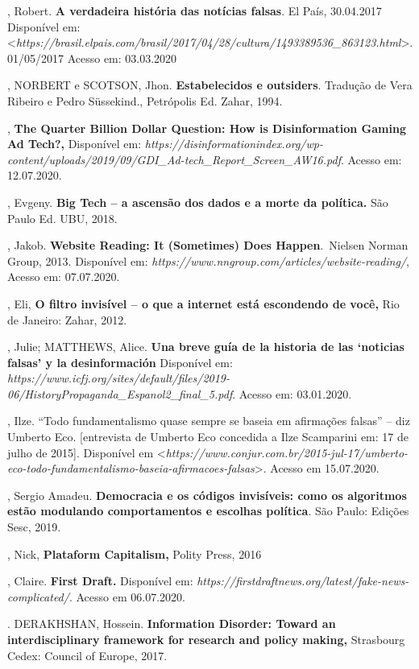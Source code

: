 \begin{bibliohedra}
, Robert. \textbf{A verdadeira história das notícias falsas}. El
País, 30.04.2017 Disponível em:
\textless{}\textit{https://brasil.elpais.com/brasil/2017/04/28/cultura/1493389536\_863123.html}\textgreater{}.
01/05/2017 Acesso em: 03.03.2020

, NORBERT e SCOTSON, Jhon. \textbf{Estabelecidos e outsiders}.
Tradução de Vera Ribeiro e Pedro Süssekind., Petrópolis Ed. Zahar, 1994.

, \textbf{The Quarter Billion Dollar
Question: How is Disinformation Gaming Ad Tech?,} Disponível em:
\textit{https://disinformationindex.org/wp-content/uploads/2019/09/GDI\_Ad-tech\_Report\_Screen\_AW16.pdf}.
Acesso em: 12.07.2020.

, Evgeny. \textbf{Big Tech -- a ascensão dos dados e a
morte da política.} São Paulo Ed. UBU, 2018.

, Jakob. \textbf{Website Reading: It (Sometimes) Does
Happen}.~Nielsen Norman Group, 2013. Disponível
em: \textit{https://www.nngroup.com/articles/website-reading/},
Acesso em: 07.07.2020.~

, Eli, \textbf{O filtro invisível -- o que a internet está
escondendo de você,} Rio de Janeiro: Zahar, 2012.

, Julie; MATTHEWS, Alice. \textbf{Una breve guía de la historia
de las `noticias falsas' y la desinformación} Disponível em:
\textit{https://www.icfj.org/sites/default/files/2019-06/HistoryPropaganda\_Espanol2\_final\_5.pdf}.
Acesso em: 03.01.2020.

, Ilze. ``Todo fundamentalismo quase
sempre se baseia em afirmações falsas'' -- diz Umberto
Eco. {[}entrevista de Umberto Eco concedida a Ilze
Scamparini em: 17 de julho de 2015{]}. Disponível em
\textless{}\textit{https://www.conjur.com.br/2015-jul-17/umberto-eco-todo-fundamentalismo-baseia-afirmacoes-falsas}\textgreater{}.
Acesso em 15.07.2020.

, Sergio Amadeu. \textbf{Democracia e os códigos
invisíveis: como os algoritmos estão modulando comportamentos e escolhas
política}. São Paulo: Edições Sesc, 2019.

, Nick, \textbf{Plataform Capitalism,} Polity Press, 2016

, Claire. \textbf{First Draft.} Disponível em:
\textit{https://firstdraftnews.org/latest/fake-news-complicated/}.
Acesso em 06.07.2020.

\titidem. DERAKHSHAN, Hossein. \textbf{Information
Disorder: Toward an interdisciplinary framework for research and policy
making,} Strasbourg Cedex: Council of Europe, 2017.
\end{bibliohedra}


